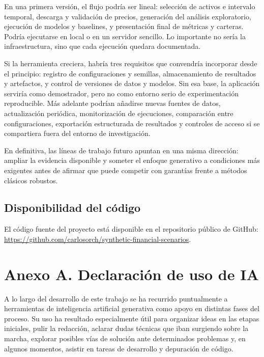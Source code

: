 \documentclass[11pt,a4paper,spanish,oneside]{book}
\numberwithin{equation}{chapter}
\numberwithin{figure}{chapter}
\begin{document}
En una primera versión, el flujo podría ser lineal: selección de activos e intervalo temporal, descarga y validación de precios, generación del análisis exploratorio, ejecución de modelos y baselines, y presentación final de métricas y carteras. Podría ejecutarse en local o en un servidor sencillo. Lo importante no sería la infraestructura, sino que cada ejecución quedara documentada.

Si la herramienta creciera, habría tres requisitos que convendría incorporar desde el principio: registro de configuraciones y semillas, almacenamiento de resultados y artefactos, y control de versiones de datos y modelos. Sin esa base, la aplicación serviría como demostrador, pero no como entorno serio de experimentación reproducible. Más adelante podrían añadirse nuevas fuentes de datos, actualización periódica, monitorización de ejecuciones, comparación entre configuraciones, exportación estructurada de resultados y controles de acceso si se compartiera fuera del entorno de investigación.

En definitiva, las líneas de trabajo futuro apuntan en una misma dirección: ampliar la evidencia disponible y someter el enfoque generativo a condiciones más exigentes antes de afirmar que puede competir con garantías frente a métodos clásicos robustos.

\section*{Disponibilidad del código}

El código fuente del proyecto está disponible en el repositorio público de GitHub: \url{https://github.com/carlosorch/synthetic-financial-scenarios}.

\backmatter



\chapter{Anexo A. Declaración de uso de IA}
A lo largo del desarrollo de este trabajo se ha recurrido puntualmente a herramientas de inteligencia artificial generativa como apoyo en distintas fases del proceso. Su uso ha resultado especialmente útil para organizar ideas en las etapas iniciales, pulir la redacción, aclarar dudas técnicas que iban surgiendo sobre la marcha, explorar posibles vías de solución ante determinados problemas y, en algunos momentos, asistir en tareas de desarrollo y depuración de código.
\end{document}
